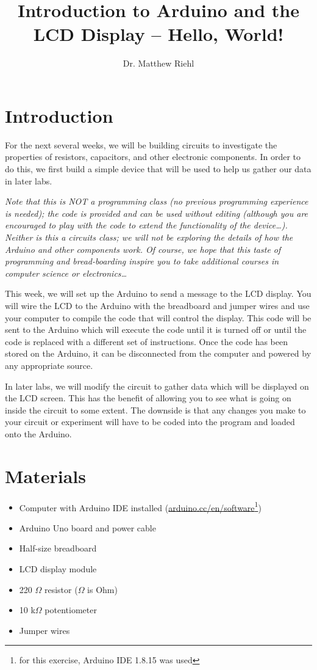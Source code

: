 \documentclass[]{article}
\title{Introduction to Arduino and the LCD Display  --  Hello, World!}
\author{Dr. Matthew Riehl}
\begin{document}
\newcommand{\tc}{\textcolor}

\maketitle

\section{Introduction}

For the next several weeks, we will be building circuits to investigate the properties of resistors, capacitors,  and other electronic components.  In order to do this, we  first build a simple device that will be used to help us gather our data in later labs.

\emph{Note that this is NOT a programming class (no previous programming experience is needed); the code is provided and can be used without editing (although you are encouraged to play with the code to extend the functionality of the device\dots). Neither is this a circuits class; we will not be exploring the details of how the Arduino and other components work.  Of course, we hope that this taste of programming and bread-boarding inspire you to take additional courses in computer science or electronics\dots}

This week, we will set up the Arduino to send a  message to the LCD display.  You will wire the LCD to the Arduino with the breadboard and jumper wires and use your computer to compile the code that will control the display. This code will be sent to the Arduino which will execute the code until it is turned off or until the code is replaced with a different set of instructions.  Once the code has been stored on the Arduino, it can be disconnected from the computer and powered by any appropriate source.

In later labs, we will modify the circuit to gather data which will be displayed on the LCD screen.  This has the benefit of allowing you to see what is going on inside the circuit to some extent.  The downside is that any changes you make to your circuit or experiment will have to be coded into the program and loaded onto the Arduino.  

\section{Materials}

\begin{itemize}
	\item Computer with Arduino IDE installed (\href{https://www.arduino.cc/en/software}{arduino.cc/en/software}\footnote{for this exercise, Arduino IDE 1.8.15 was used})
	\item Arduino Uno board and power cable
	\item Half-size breadboard
	\item LCD display module
	\item 220 $\Omega$ resistor ($\Omega$ is Ohm)
	\item 10 k$\Omega$ potentiometer
	\item Jumper wires
\end{itemize}
\end{document}
